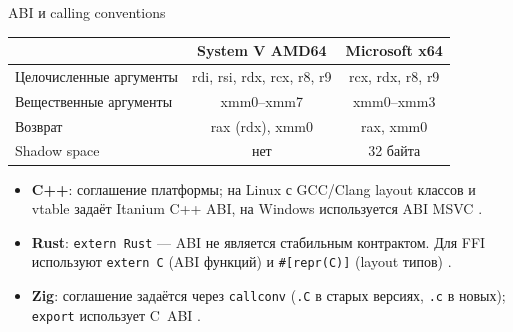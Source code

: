 \documentclass[aspectratio=169,11pt]{beamer}
\newcommand{\externC}{\texttt{extern~\textquotedbl C\textquotedbl}}
\begin{document}
\begin{frame}{ABI и calling conventions}
  \small
  \begin{center}
    \begin{tabularx}{0.86\textwidth}{lCC}
      \toprule
                                & System V AMD64 \cite{psabi}   & Microsoft x64 \cite{pecoff} \\
      \midrule
      Целочисленные аргументы   & rdi, rsi, rdx, rcx, r8, r9    & rcx, rdx, r8, r9            \\
      Вещественные аргументы    & xmm0--xmm7                    & xmm0--xmm3                  \\
      Возврат                   & rax (rdx), xmm0               & rax, xmm0                   \\
      Shadow space              & нет                           & 32 байта                    \\
      \bottomrule
    \end{tabularx}
  \end{center}
  \begin{itemize}
    \item \textbf{C++}: соглашение платформы; на Linux с GCC/Clang layout классов и vtable задаёт Itanium C++ ABI, на Windows используется ABI MSVC \cite{itanium}.
    \item \textbf{Rust}: \texttt{extern~\textquotedbl Rust\textquotedbl} --- ABI не является стабильным контрактом. Для FFI используют \externC{} (ABI функций) и \texttt{\#[repr(C)]} (layout типов) \cite{rustref}.
    \item \textbf{Zig}: соглашение задаётся через \texttt{callconv} (\texttt{.C} в старых версиях, \texttt{.c} в новых); \texttt{export} использует C~ABI \cite{zigdoc}.
  \end{itemize}
\end{frame}
\end{document}
